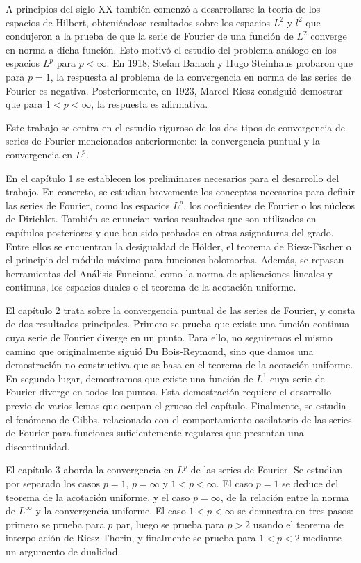 \documentclass[a4paper, 12pt, oneside]{book}
\begin{document}
A principios del siglo XX también comenzó a desarrollarse la teoría de los espacios de Hilbert, obteniéndose resultados sobre los espacios $L^2$ y $l^2$ que condujeron a la prueba de que la serie de Fourier de una función de $L^2$ converge en norma a dicha función. Esto motivó el estudio del problema análogo en los espacios $L^p$ para $p < \infty$. En 1918, Stefan Banach y Hugo Steinhaus probaron que para $p = 1$, la respuesta al problema de la convergencia en norma de las series de Fourier es negativa. Posteriormente, en 1923, Marcel Riesz consiguió demostrar que para $1 <p < \infty$, la respuesta es afirmativa.

Este trabajo se centra en el estudio riguroso de los dos tipos de convergencia de series de Fourier mencionados anteriormente: la convergencia puntual y la convergencia en $L^p$.

En el capítulo 1 se establecen los preliminares necesarios para el desarrollo del trabajo. En concreto, se estudian brevemente los conceptos necesarios para definir las series de Fourier, como los espacios $L^p$, los coeficientes de Fourier o los núcleos de Dirichlet. También se enuncian varios resultados que son utilizados en capítulos posteriores y que han sido probados en otras asignaturas del grado. Entre ellos se encuentran la desigualdad de Hölder, el teorema de Riesz-Fischer o el principio del módulo máximo para funciones holomorfas. Además, se repasan herramientas del Análisis Funcional como la norma de aplicaciones lineales y continuas, los espacios duales o el teorema de la acotación uniforme.

El capítulo 2 trata sobre la convergencia puntual de las series de Fourier, y consta de dos resultados principales. Primero se prueba que existe una función continua cuya serie de Fourier diverge en un punto. Para ello, no seguiremos el mismo camino que originalmente siguió Du Bois-Reymond, sino que damos una demostración no constructiva que se basa en el teorema de la acotación uniforme. En segundo lugar, demostramos que existe una función de $L^1$ cuya serie de Fourier diverge en todos los puntos. Esta demostración requiere el desarrollo previo de varios lemas que ocupan el grueso del capítulo. Finalmente, se estudia el fenómeno de Gibbs, relacionado con el comportamiento oscilatorio de las series de Fourier para funciones suficientemente regulares que presentan una discontinuidad.

El capítulo 3 aborda la convergencia en $L^p$ de las series de Fourier. Se estudian por separado los casos $p = 1$, $p = \infty$ y $1<p<\infty$. El caso $p = 1$ se deduce del teorema de la acotación uniforme, y el caso $p = \infty$, de la relación entre la norma de $L^\infty$ y la convergencia uniforme. El caso $1<p<\infty$ se demuestra en tres pasos: primero se prueba para $p$ par, luego se prueba para $p > 2$ usando el teorema de interpolación de Riesz-Thorin, y finalmente se prueba para $1<p<2$ mediante un argumento de dualidad.
\end{document}

